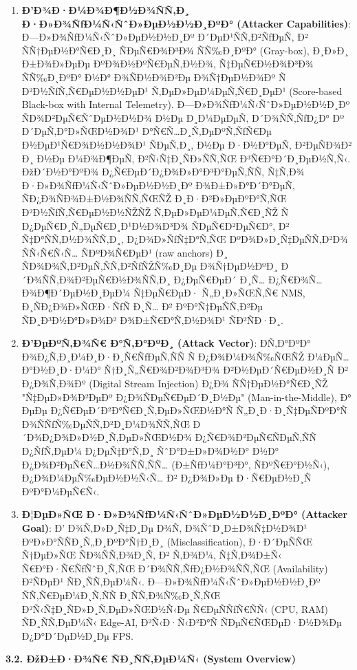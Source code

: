 \documentclass[]{article}
\begin{document}
\begin{enumerate}
\def\labelenumi{\arabic{enumi}.}
\item
  \textbf{Ð’Ð¾Ð·Ð¼Ð¾Ð¶Ð½Ð¾ÑÑ‚Ð¸ Ð·Ð»Ð¾ÑƒÐ¼Ñ‹ÑˆÐ»ÐµÐ½Ð½Ð¸ÐºÐ° (Attacker Capabilities)}: Ð—Ð»Ð¾ÑƒÐ¼Ñ‹ÑˆÐ»ÐµÐ½Ð½Ð¸Ðº Ð´ÐµÐ¹ÑÑ‚Ð²ÑƒÐµÑ‚ Ð² ÑÑ†ÐµÐ½Ð°Ñ€Ð¸Ð¸ ÑÐµÑ€Ð¾Ð³Ð¾ ÑÑ‰Ð¸ÐºÐ° (Gray-box), Ð¸Ð»Ð¸ Ð±Ð¾Ð»ÐµÐµ ÐºÐ¾Ð½ÐºÑ€ÐµÑ‚Ð½Ð¾, Ñ‡ÐµÑ€Ð½Ð¾Ð³Ð¾ ÑÑ‰Ð¸ÐºÐ° Ð½Ð° Ð¾ÑÐ½Ð¾Ð²Ðµ Ð¾Ñ†ÐµÐ½Ð¾Ðº Ñ Ð²Ð½ÑƒÑ‚Ñ€ÐµÐ½Ð½ÐµÐ¹ Ñ‚ÐµÐ»ÐµÐ¼ÐµÑ‚Ñ€Ð¸ÐµÐ¹ (Score-based Black-box with Internal Telemetry). Ð—Ð»Ð¾ÑƒÐ¼Ñ‹ÑˆÐ»ÐµÐ½Ð½Ð¸Ðº ÑÐ¾Ð²ÐµÑ€ÑˆÐµÐ½Ð½Ð¾ Ð½Ðµ Ð¸Ð¼ÐµÐµÑ‚ Ð´Ð¾ÑÑ‚ÑƒÐ¿Ð° Ðº Ð´ÐµÑ‚Ð°Ð»ÑŒÐ½Ð¾Ð¹ Ð°Ñ€Ñ…Ð¸Ñ‚ÐµÐºÑ‚ÑƒÑ€Ðµ Ð½ÐµÐ¹Ñ€Ð¾Ð½Ð½Ð¾Ð¹ ÑÐµÑ‚Ð¸, Ð½Ðµ Ð·Ð½Ð°ÐµÑ‚ Ð²ÐµÑÐ¾Ð² Ð¸ Ð½Ðµ Ð¼Ð¾Ð¶ÐµÑ‚ Ð²Ñ‹Ñ‡Ð¸ÑÐ»ÑÑ‚ÑŒ Ð³Ñ€Ð°Ð´Ð¸ÐµÐ½Ñ‚Ñ‹. ÐžÐ´Ð½Ð°ÐºÐ¾ Ð¿Ñ€ÐµÐ´Ð¿Ð¾Ð»Ð°Ð³Ð°ÐµÑ‚ÑÑ, Ñ‡Ñ‚Ð¾ Ð·Ð»Ð¾ÑƒÐ¼Ñ‹ÑˆÐ»ÐµÐ½Ð½Ð¸Ðº Ð¾Ð±Ð»Ð°Ð´Ð°ÐµÑ‚ ÑÐ¿Ð¾ÑÐ¾Ð±Ð½Ð¾ÑÑ‚ÑŒÑŽ Ð¸Ð·Ð²Ð»ÐµÐºÐ°Ñ‚ÑŒ Ð²Ð½ÑƒÑ‚Ñ€ÐµÐ½Ð½ÑŽÑŽ Ñ‚ÐµÐ»ÐµÐ¼ÐµÑ‚Ñ€Ð¸ÑŽ Ñ Ð¿ÐµÑ€Ð¸Ñ„ÐµÑ€Ð¸Ð¹Ð½Ð¾Ð³Ð¾ ÑÐµÑ€Ð²ÐµÑ€Ð°, Ð² Ñ‡Ð°ÑÑ‚Ð½Ð¾ÑÑ‚Ð¸, Ð¿Ð¾Ð»ÑƒÑ‡Ð°Ñ‚ÑŒ ÐºÐ¾Ð»Ð¸Ñ‡ÐµÑÑ‚Ð²Ð¾ ÑÑ‹Ñ€Ñ‹Ñ… ÑÐºÐ¾Ñ€ÐµÐ¹ (raw anchors) Ð¸ ÑÐ¾Ð¾Ñ‚Ð²ÐµÑ‚ÑÑ‚Ð²ÑƒÑŽÑ‰Ð¸Ðµ Ð¾Ñ†ÐµÐ½ÐºÐ¸ Ð´Ð¾ÑÑ‚Ð¾Ð²ÐµÑ€Ð½Ð¾ÑÑ‚Ð¸ Ð¿ÐµÑ€ÐµÐ´ Ð¸Ñ… Ð¿Ñ€Ð¾Ñ…Ð¾Ð¶Ð´ÐµÐ½Ð¸ÐµÐ¼ Ñ‡ÐµÑ€ÐµÐ· Ñ„Ð¸Ð»ÑŒÑ‚Ñ€ NMS, Ð¸ÑÐ¿Ð¾Ð»ÑŒÐ·ÑƒÑ Ð¸Ñ… Ð² ÐºÐ°Ñ‡ÐµÑÑ‚Ð²Ðµ ÑÐ¸Ð³Ð½Ð°Ð»Ð¾Ð² Ð¾Ð±Ñ€Ð°Ñ‚Ð½Ð¾Ð¹ ÑÐ²ÑÐ·Ð¸.
\item
  \textbf{Ð’ÐµÐºÑ‚Ð¾Ñ€ Ð°Ñ‚Ð°ÐºÐ¸ (Attack Vector)}: ÐÑ‚Ð°ÐºÐ° Ð¾Ð¿Ñ‚Ð¸Ð¼Ð¸Ð·Ð¸Ñ€ÑƒÐµÑ‚ÑÑ Ñ Ð¿Ð¾Ð¼Ð¾Ñ‰ÑŒÑŽ Ð¼ÐµÑ…Ð°Ð½Ð¸Ð·Ð¼Ð° Ñ†Ð¸Ñ„Ñ€Ð¾Ð²Ð¾Ð³Ð¾ Ð²Ð½ÐµÐ´Ñ€ÐµÐ½Ð¸Ñ Ð² Ð¿Ð¾Ñ‚Ð¾Ðº (Digital Stream Injection) Ð¿Ð¾ ÑÑ†ÐµÐ½Ð°Ñ€Ð¸ÑŽ "Ñ‡ÐµÐ»Ð¾Ð²ÐµÐº Ð¿Ð¾ÑÐµÑ€ÐµÐ´Ð¸Ð½Ðµ" (Man-in-the-Middle), Ð° ÐµÐµ Ð¿Ñ€ÐµÐ´Ð²Ð°Ñ€Ð¸Ñ‚ÐµÐ»ÑŒÐ½Ð°Ñ Ñ„Ð¸Ð·Ð¸Ñ‡ÐµÑÐºÐ°Ñ Ð¾ÑÑƒÑ‰ÐµÑÑ‚Ð²Ð¸Ð¼Ð¾ÑÑ‚ÑŒ Ð´Ð¾Ð¿Ð¾Ð»Ð½Ð¸Ñ‚ÐµÐ»ÑŒÐ½Ð¾ Ð¿Ñ€Ð¾Ð²ÐµÑ€ÑÐµÑ‚ÑÑ Ð¿ÑƒÑ‚ÐµÐ¼ Ð¿ÐµÑ‡Ð°Ñ‚Ð¸ ÑˆÐ°Ð±Ð»Ð¾Ð½Ð° Ð½Ð° Ð¿Ð¾Ð²ÐµÑ€Ñ…Ð½Ð¾ÑÑ‚ÑÑ… (Ð±ÑƒÐ¼Ð°Ð³Ð°, ÑÐºÑ€Ð°Ð½Ñ‹), Ð¿Ð¾Ð¼ÐµÑ‰ÐµÐ½Ð½Ñ‹Ñ… Ð² Ð¿Ð¾Ð»Ðµ Ð·Ñ€ÐµÐ½Ð¸Ñ ÐºÐ°Ð¼ÐµÑ€Ñ‹.
\item
  \textbf{Ð¦ÐµÐ»ÑŒ Ð·Ð»Ð¾ÑƒÐ¼Ñ‹ÑˆÐ»ÐµÐ½Ð½Ð¸ÐºÐ° (Attacker Goal)}: Ð’ Ð¾Ñ‚Ð»Ð¸Ñ‡Ð¸Ðµ Ð¾Ñ‚ Ð¾ÑˆÐ¸Ð±Ð¾Ñ‡Ð½Ð¾Ð¹ ÐºÐ»Ð°ÑÑÐ¸Ñ„Ð¸ÐºÐ°Ñ†Ð¸Ð¸ (Misclassification), Ð·Ð´ÐµÑÑŒ Ñ†ÐµÐ»ÑŒ ÑÐ¾ÑÑ‚Ð¾Ð¸Ñ‚ Ð² Ñ‚Ð¾Ð¼, Ñ‡Ñ‚Ð¾Ð±Ñ‹ Ñ€Ð°Ð·Ñ€ÑƒÑˆÐ¸Ñ‚ÑŒ Ð´Ð¾ÑÑ‚ÑƒÐ¿Ð½Ð¾ÑÑ‚ÑŒ (Availability) Ð²ÑÐµÐ¹ ÑÐ¸ÑÑ‚ÐµÐ¼Ñ‹. Ð—Ð»Ð¾ÑƒÐ¼Ñ‹ÑˆÐ»ÐµÐ½Ð½Ð¸Ðº ÑÑ‚Ñ€ÐµÐ¼Ð¸Ñ‚ÑÑ Ð¸ÑÑ‚Ð¾Ñ‰Ð¸Ñ‚ÑŒ Ð²Ñ‹Ñ‡Ð¸ÑÐ»Ð¸Ñ‚ÐµÐ»ÑŒÐ½Ñ‹Ðµ Ñ€ÐµÑÑƒÑ€ÑÑ‹ (CPU, RAM) ÑÐ¸ÑÑ‚ÐµÐ¼Ñ‹ Edge-AI, Ð²Ñ‹Ð·Ñ‹Ð²Ð°Ñ ÑÐµÑ€ÑŒÐµÐ·Ð½Ð¾Ðµ Ð¿Ð°Ð´ÐµÐ½Ð¸Ðµ FPS.
\end{enumerate}

\textbf{3.2. ÐžÐ±Ð·Ð¾Ñ€ ÑÐ¸ÑÑ‚ÐµÐ¼Ñ‹ (System Overview)}
\end{document}
